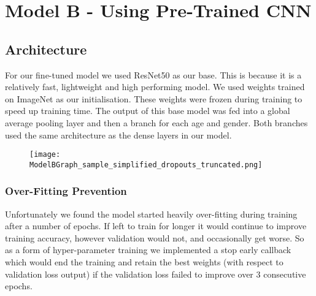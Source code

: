 
\section{Model B - Using Pre-Trained CNN}
\subsection{Architecture}
For our fine-tuned model we used ResNet50 as our base. This is because it is a relatively fast,
lightweight and high performing model. We used weights trained on ImageNet as our initialisation.
These weights were frozen during training to speed up training time.
The output of this base model was fed into a global average pooling layer and then a branch for each age and gender. Both branches used the same architecture as the dense layers in our model.  
\begin{figure}[h]
    \centering
    \texttt{[image: ModelBGraph\_sample\_simplified\_dropouts\_truncated.png]}
\end{figure}

\subsubsection{Over-Fitting Prevention}
Unfortunately we found the model started heavily over-fitting during training after a number of epochs.
If left to train for longer it would continue to improve training accuracy, however validation would not, and occasionally get worse.
So as a form of hyper-parameter training we implemented a stop early callback which would end the training and retain the best weights (with respect to validation loss output) if the validation loss failed to improve over 3 consecutive epochs.

